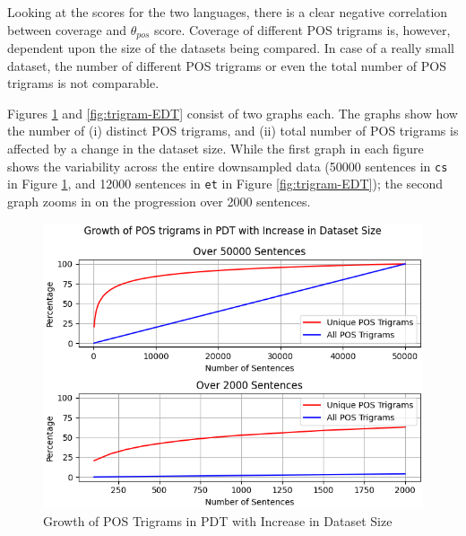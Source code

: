 Looking at the scores for the two languages, there is a clear negative correlation between coverage and $\theta_{pos}$ score. Coverage of different POS trigrams is, however, dependent upon the size of the datasets being compared. In case of a really small dataset, the number of different POS trigrams or even the total number of POS trigrams is not comparable.

Figures \ref{fig:trigram-PDT} and \ref{fig:trigram-EDT} consist of two graphs each. The graphs show how the number of (i) distinct POS trigrams, and (ii) total number of POS trigrams is affected by a change in the dataset size. While the first graph in each figure shows the variability across the entire downsampled data (50000 sentences in \texttt{cs} in Figure \ref{fig:trigram-PDT}, and 12000 sentences in \texttt{et} in Figure \ref{fig:trigram-EDT}); the second graph zooms in on the progression over 2000 sentences.

\begin{figure}[H]
    \centering
    \includegraphics[scale=0.75]{img/trigram-stats-PDT.png}
    \caption{Growth of POS Trigrams in PDT with Increase in Dataset Size}
    \label{fig:trigram-PDT}
\end{figure}

